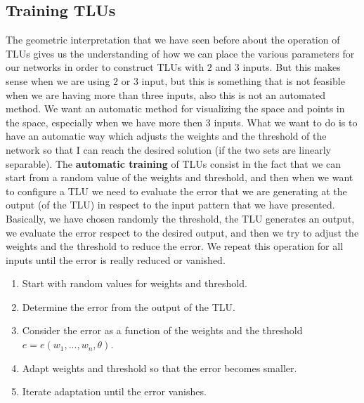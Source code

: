 \documentclass{article}
\begin{document}
\pagebreak
\subsection{Training TLUs}
The geometric interpretation that we have seen before about the operation of TLUs gives us the
understanding of how we can place the various parameters for our networks in order to
construct TLUs with $2$ and $3$ inputs.
\newline\newline
But this makes sense when we are using $2$ or $3$ input, but this is something that is not
feasible when we are having more than three inputs, also this is not an automated method.
\newline\newline
We want an automatic method for visualizing the space and points in the space, especially when
we have more then $3$ inputs.
\newline\newline
What we want to do is to have an automatic way which adjusts the weights and the threshold
of the network so that I can reach the desired solution (if the two sets are linearly separable).
\newline\newline
The \textbf{automatic training} of TLUs consist in the fact that we can start from a random value
of the weights and threshold, and then when we want to configure a TLU we need to evaluate
the error that we are generating at the output (of the TLU) in respect to the input pattern
that we have presented.
\newline\newline
Basically, we have chosen randomly the threshold, the TLU generates an output, we evaluate
the error respect to the desired output, and then we try to adjust the weights and the
threshold to reduce the error.
\newline\newline
We repeat this operation for all inputs until the error is really reduced or vanished.
\begin{enumerate}
    \item Start with random values for weights and threshold.
    \item Determine the error from the output of the TLU.
    \item Consider the error as a function of the weights and the threshold $e=e(w_1,...,w_n,\theta)$.
    \item Adapt weights and threshold so that the error becomes smaller.
    \item Iterate adaptation until the error vanishes.
\end{enumerate}
\end{document}
